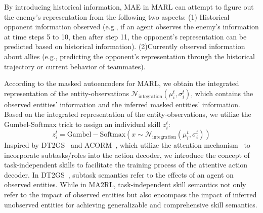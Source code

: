 By introducing historical information, MAE in MARL can attempt to figure out the enemy's representation from the following two aspects: (1) Historical opponent information observed (e.g., if an agent observes the enemy's information at time steps 5 to 10, then after step 11, the opponent's representation can be predicted based on historical information). (2)Currently observed information about allies (e.g., predicting the opponent's representation through the historical trajectory or current behavior of teammates).

According to the masked autoencoders for MARL, we obtain the integrated representation of the entity-observations $\mathcal{N}_{\mathrm{integration}}(\mu_{i}^t,\sigma_{i}^t)$, which contains the observed entities' information and the inferred masked entities' information. Based on the integrated representation of the entity-observations, we utilize the Gumbel-Softmax trick to assign an individual skill $z_i^t$:
\begin{equation}
z_i^t=\mathrm{Gambel-Softmax}(x \sim \mathcal{N}_{\mathrm{integration}}(\mu_{i}^t,\sigma_{i}^t))
\label{eq:skill}
\end{equation}
Inspired by DT2GS~\cite{Decompose_Tian} and ACORM~\cite{hu2023attention}, which utilize the attention mechanism~\cite{vaswani2017attention} to incorporate subtasks/roles into the action decoder, we introduce the concept of task-independent skills to facilitate the training process of the attentive action decoder. In DT2GS~\cite{Decompose_Tian}, subtask semantics refer to the effects of an agent on observed entities. While in MA2RL, task-independent skill semantics not only refer to the impact of observed entities but also encompass the impact of inferred unobserved entities for achieving generalizable and comprehensive skill semantics.

